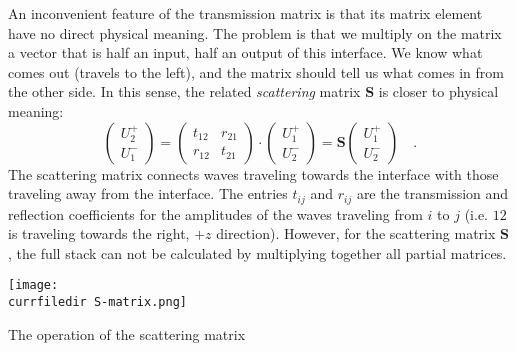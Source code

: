 An inconvenient feature of the transmission matrix is that its matrix element have no direct physical meaning. The problem is that we multiply on the matrix a vector that is half an input, half an output of this interface. We know what comes out (travels to the left), and the matrix should tell us what comes in from the other side. In this sense, the related \emph{scattering} matrix $\mathbf{S}$ is closer to physical meaning:
\begin{equation}
\begin{pmatrix}
U_2^+ \\ U_1^-
\end{pmatrix}
= 
\begin{pmatrix}
t_{12} & r_{21}  \\ r_{12} & t_{21}
\end{pmatrix}
\cdot
\begin{pmatrix}
U_1^+ \\ U_2^-
\end{pmatrix}
%
= \mathbf{S}
\begin{pmatrix}
U_1^+ \\ U_2^-
\end{pmatrix} \quad . 
\end{equation}
The scattering matrix connects waves traveling towards the interface with those traveling away from the interface. The entries $t_{ij}$ and $r_{ij}$ are the transmission and reflection coefficients for the amplitudes of the waves traveling from $i$ to $j$ (i.e. $12$ is traveling towards the right, $+z$ direction). However, for the scattering matrix $\mathbf{S}$, the full stack can not be calculated by multiplying together all partial matrices.

\begin{marginfigure}
\texttt{[image: \\currfiledir S-matrix.png]}

\caption{The operation of the scattering matrix
\label{fig:6_S_matrix}}
\end{marginfigure}

